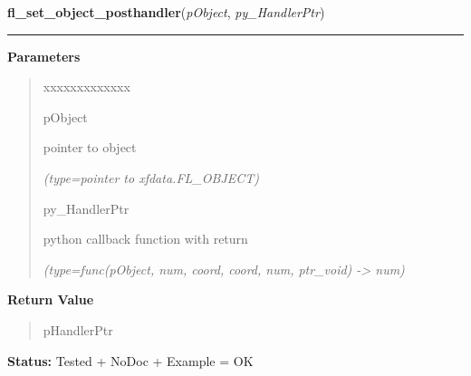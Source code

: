 \hspace{.8\funcindent}\begin{boxedminipage}{\funcwidth}

    \raggedright \textbf{fl\_set\_object\_posthandler}(\textit{pObject}, \textit{py\_HandlerPtr})

    \vspace{-1.5ex}

    \rule{\textwidth}{0.5\fboxrule}
\setlength{\parskip}{2ex}
\setlength{\parskip}{1ex}
      \textbf{Parameters}
      \vspace{-1ex}

      \begin{quote}
        \begin{Ventry}{xxxxxxxxxxxxx}

          \item[pObject]

          pointer to object

            {\it (type=pointer to xfdata.FL\_OBJECT)}

          \item[py\_HandlerPtr]

          python callback function with return

            {\it (type=func(pObject, num, coord, coord, num, ptr\_void) -{\textgreater} num)}

        \end{Ventry}

      \end{quote}

      \textbf{Return Value}
    \vspace{-1ex}

      \begin{quote}
      pHandlerPtr

      \end{quote}

\textbf{Status:} Tested + NoDoc + Example = OK



    \end{boxedminipage}

    \label{xformslib:library:fl_set_object_callback}

    \vspace{0.5ex}

